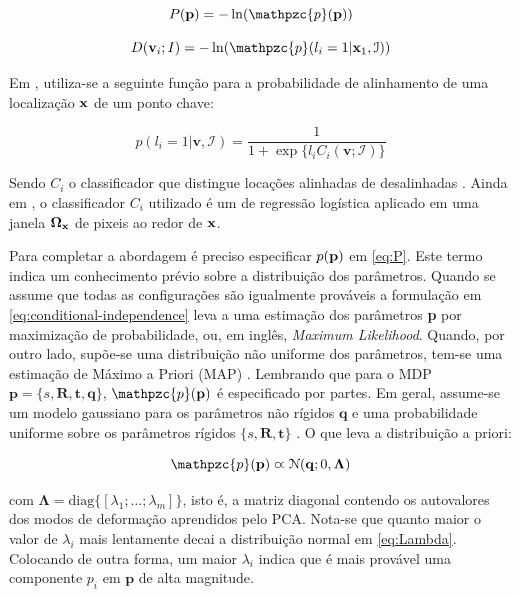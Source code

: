 {\begin{equation}
\label{eq:P}
P(\mathbf{p}) = 
-\ln
(
\mathpzc{p}(\mathbf{p})
)
\end{equation}

\begin{equation}
D(\mathbf{v}_i; I) =
-\ln
(
\mathpzc{p}(l_i=1 | \mathbf{x}_1, \mathcal{I})
)
\end{equation}

Em \cite{facetracker}, utiliza-se a seguinte função para a probabilidade de alinhamento de uma localização $\bf{x}$ de um ponto chave: 

\begin{equation}
p(l_i = 1|\textbf{v},\mathcal{I}) = \frac{1}{1 + \exp{\{}l_iC_i(\textbf{v};\mathcal{I}){\}}}
\label{eq:alg1}
\end{equation}

Sendo $C_i$ o classificador que distingue locações alinhadas de desalinhadas
\cite{saragih2011deformable}. Ainda em \cite{facetracker}, o classificador $C_i$
utilizado é um de regressão logística aplicado em uma janela $\bf{\Omega_x}$ de
pixeis ao redor de $\bf{x}$.

Para completar a abordagem é preciso especificar $p(\bf{p})$ em \ref{eq:P}. Este
termo indica um conhecimento prévio sobre a distribuição dos parâmetros. Quando
se assume que todas as configurações são igualmente prováveis a formulação em
\ref{eq:conditional-independence} leva a uma estimação dos parâmetros \textbf{p}
por maximização de probabilidade, ou, em inglês, \textit{Maximum Likelihood}.
Quando, por outro lado, supõe-se uma distribuição não uniforme dos parâmetros,
tem-se uma estimação de Máximo a Priori (MAP) \cite{saragih2011deformable}.
Lembrando que para o MDP $\mathbf{p}=\{s,\mathbf{R},\mathbf{t},\mathbf{q}\}$,
$\mathpzc{p}(\mathbf{p})$ é especificado por partes. Em geral, assume-se um
modelo gaussiano para os parâmetros não rígidos $\mathbf{q}$ e uma probabilidade
uniforme sobre os parâmetros rígidos $\{s,\mathbf{R},\mathbf{t}\}$
\cite{facetracker}. O que leva a distribuição a priori:

\begin{equation}
\mathpzc{p}(\mathbf{p}) \varpropto \mathcal{N}(\mathbf{q}; 0, \mathbf{\Lambda})
\label{eq:Lambda}
\end{equation}

com $\mathbf{\Lambda} = \text{diag}\{[ \lambda_1; \ldots; \lambda_m]\}$, isto é,
a matriz diagonal contendo os autovalores dos modos de deformação aprendidos
pelo PCA. Nota-se que quanto maior o valor de $\lambda_i$ mais lentamente decai
a distribuição normal em \ref{eq:Lambda}. Colocando de outra forma, um maior
$\lambda_i$ indica que é mais provável uma componente $p_i$ em $\mathbf{p}$ de
alta magnitude.


}
